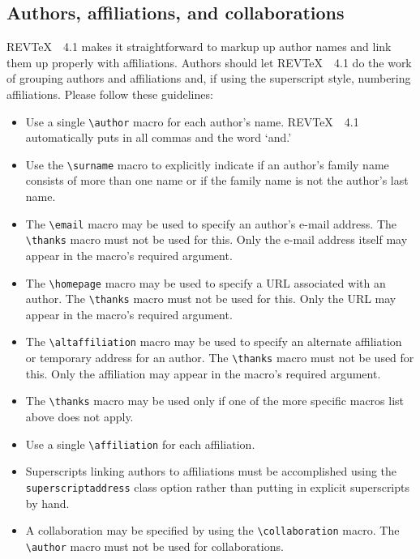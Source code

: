 \documentclass[twocolumn,secnumarabic,amssymb, nobibnotes, aps, prd]{revtex4-1}
\newcommand{\revtex}{REV\TeX\ }
\newcommand{\classoption}[1]{\texttt{#1}}
\newcommand{\macro}[1]{\texttt{\textbackslash#1}}
\newcommand{\m}[1]{\macro{#1}}
\begin{document}
\subsection{Authors, affiliations, and collaborations}
\label{sec:authors}
\revtex\ 4.1 makes it straightforward to markup up author names and link them up properly with affiliations. Authors should let \revtex\ 4.1 do the work of grouping authors and affiliations and, if using the superscript style, numbering affiliations. Please follow these guidelines:
\begin{itemize}
\item Use a single \m{author} macro for each author's name. \revtex\ 4.1 automatically puts in all commas and the word `and.'
\item Use the \m{surname} macro to explicitly indicate if an author's family name consists of more than one name or if the family name is not the author's last name.
\item The \m{email} macro may be used to specify an author's e-mail
address. The \m{thanks} macro must not be used for this. Only the
e-mail address itself may appear in the macro's required argument.
\item The \m{homepage} macro may be used to specify a URL associated
with an author. The \m{thanks} macro must not be used for this. Only the
URL may appear in the macro's required argument.
\item The \m{altaffiliation} macro may be used to specify an alternate
affiliation or temporary address for an author. The \m{thanks} macro
must not be used for this. Only the affiliation
may appear in the macro's required argument.
\item The \m{thanks} macro may be used only if one of the more
specific macros list above does not apply.
\item Use a single \m{affiliation} for each affiliation.
\item Superscripts linking authors to affiliations must be
accomplished using the \classoption{superscriptaddress} class option
rather than putting in explicit superscripts by hand.
\item A collaboration may be specified by using the \m{collaboration}
macro. The \m{author} macro must not be used for collaborations.
\end{itemize}
\end{document}
